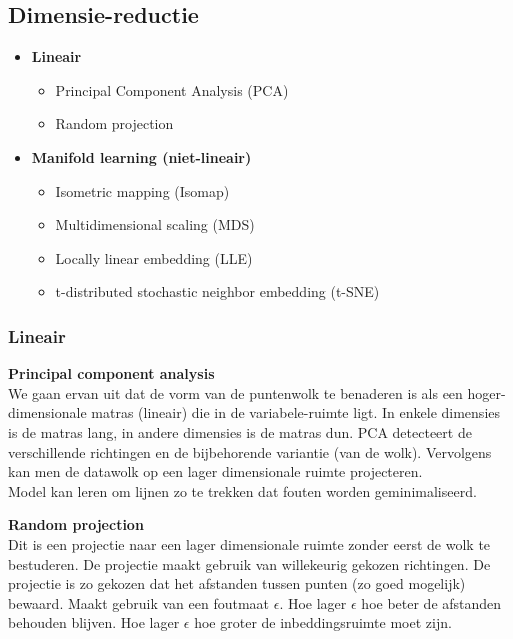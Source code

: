 {\subsection{Dimensie-reductie}
\begin{itemize}
    \item \textbf{Lineair}
    \begin{itemize}
        \item Principal Component Analysis (PCA)
        \item Random projection
    \end{itemize}
    \item \textbf{Manifold learning (niet-lineair)}
    \begin{itemize}
        \item Isometric mapping (Isomap)
        \item Multidimensional scaling (MDS)
        \item Locally linear embedding (LLE)
        \item t-distributed stochastic neighbor embedding (t-SNE)
    \end{itemize}
\end{itemize}
\subsubsection{Lineair}
\textbf{Principal component analysis}\\
We gaan ervan uit dat de vorm van de puntenwolk te benaderen is als een hoger-dimensionale matras (lineair) die in de variabele-ruimte ligt. In enkele dimensies is de matras lang, in andere dimensies is de matras dun. PCA detecteert de verschillende richtingen en de bijbehorende variantie (van de wolk). Vervolgens kan men de datawolk op een lager dimensionale ruimte projecteren.\\

\noindent Model kan leren om lijnen zo te trekken dat fouten worden geminimaliseerd.

\textbf{Random projection}\\
Dit is een projectie naar een lager dimensionale ruimte zonder eerst de wolk te bestuderen.
De projectie maakt gebruik van willekeurig gekozen richtingen. De projectie is zo gekozen dat het afstanden tussen punten (zo goed mogelijk) bewaard. Maakt gebruik van een foutmaat $\epsilon$. Hoe lager $\epsilon$ hoe beter de afstanden behouden blijven. Hoe lager $\epsilon$ hoe groter de inbeddingsruimte moet zijn.\\

}
